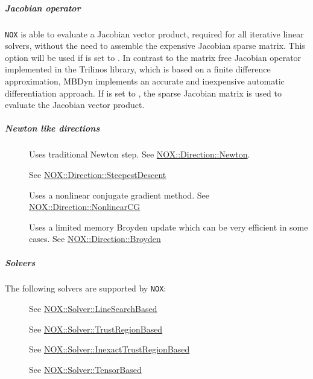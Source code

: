 \subparagraph{Jacobian operator}
\verb;NOX; is able to evaluate a Jacobian vector product, required for all iterative linear solvers, without the need to assemble the expensive Jacobian sparse matrix. This option will be used if  is set to . In contrast to the matrix free Jacobian operator implemented in the Trilinos library, which is based on a finite difference approximation, MBDyn implements an accurate and inexpensive automatic differentiation approach. If  is set to , the sparse Jacobian matrix is used to evaluate the Jacobian vector product.
\subparagraph{Newton like directions}

\begin{description}
\item[] Uses traditional Newton step. See \href{https://docs.trilinos.org/latest-release/packages/nox/doc/html/classNOX_1_1Direction_1_1Newton.html}{NOX::Direction::Newton}.
\item[] See \href{https://docs.trilinos.org/latest-release/packages/nox/doc/html/classNOX_1_1Direction_1_1SteepestDescent.html}{NOX::Direction::SteepestDescent}
\item[] Uses a nonlinear conjugate gradient method. See \href{https://docs.trilinos.org/latest-release/packages/nox/doc/html/classNOX_1_1Direction_1_1NonlinearCG.html}{NOX::Direction::NonlinearCG}
\item[] Uses a limited memory Broyden update which can be very efficient in some cases. See \href{https://docs.trilinos.org/latest-release/packages/nox/doc/html/classNOX_1_1Direction_1_1Broyden.html}{NOX::Direction::Broyden}
\end{description}
\subparagraph{Solvers}
The following solvers are supported by \verb;NOX;:
\begin{description}
\item[] See \href{https://docs.trilinos.org/latest-release/packages/nox/doc/html/classNOX_1_1Solver_1_1LineSearchBased.html}{NOX::Solver::LineSearchBased}
\item[] See \href{https://docs.trilinos.org/latest-release/packages/nox/doc/html/classNOX_1_1Solver_1_1TrustRegionBased.html}{NOX::Solver::TrustRegionBased}
\item[] See \href{https://docs.trilinos.org/latest-release/packages/nox/doc/html/classNOX_1_1Solver_1_1InexactTrustRegionBased.html}{NOX::Solver::InexactTrustRegionBased}
\item[] See \href{https://docs.trilinos.org/latest-release/packages/nox/doc/html/classNOX_1_1Solver_1_1TensorBased.html}{NOX::Solver::TensorBased}
\end{description}
